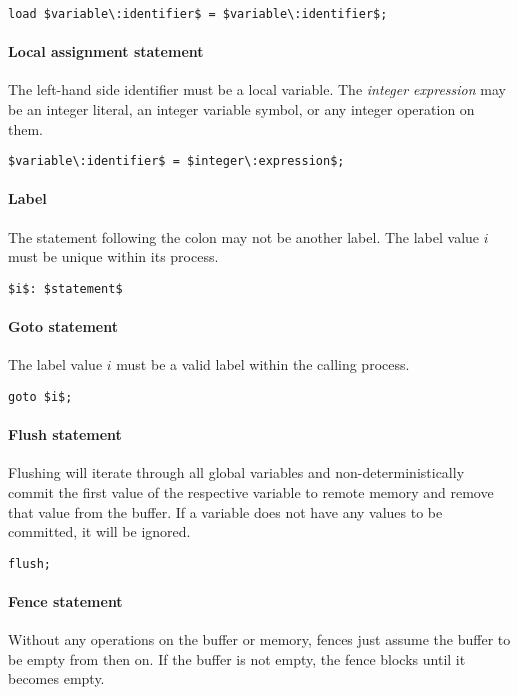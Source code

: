 \begin{lstlisting}[frame=single, mathescape]
load $variable\:identifier$ = $variable\:identifier$;
\end{lstlisting}

\paragraph{Local assignment statement}
The left-hand side identifier must be a local variable. The \emph{integer expression} may be an integer literal, an integer variable symbol, or any integer operation on them.

\begin{lstlisting}[frame=single, mathescape]
$variable\:identifier$ = $integer\:expression$;
\end{lstlisting}

\paragraph{Label}
The statement following the colon may not be another label. The label value $i$ must be unique within its process.

\begin{lstlisting}[frame=single, mathescape]
$i$: $statement$
\end{lstlisting}

\paragraph{Goto statement}
The label value $i$ must be a valid label within the calling process.

\begin{lstlisting}[frame=single, mathescape]
goto $i$;
\end{lstlisting}

\paragraph{Flush statement}
Flushing will iterate through all global variables and non-deterministically commit the first value of the respective variable to remote memory and remove that value from the buffer. If a variable does not have any values to be committed, it will be ignored.

\begin{lstlisting}[frame=single, mathescape]
flush;
\end{lstlisting}

\paragraph{Fence statement}
Without any operations on the buffer or memory, fences just assume the buffer to be empty from then on. If the buffer is not empty, the fence blocks until it becomes empty.

